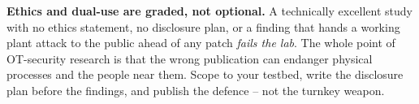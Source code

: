 \documentclass[11pt,a4paper]{article}
\begin{document}
\begin{warnbox}
\textbf{Ethics and dual-use are graded, not optional.} A technically excellent study with no ethics statement, no disclosure plan, or a finding that hands a working plant attack to the public ahead of any patch \emph{fails the lab}. The whole point of OT-security research is that the wrong publication can endanger physical processes and the people near them. Scope to your testbed, write the disclosure plan before the findings, and publish the defence -- not the turnkey weapon.
\end{warnbox}
\end{document}
